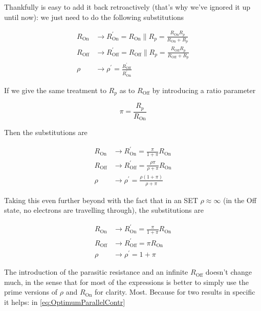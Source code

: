 \documentclass[../main.tex]{subfiles}
\begin{document}
Thankfully is easy to add it back retroactively (that's why we've ignored it
up until now): we just need to do the following substitutions

\begin{align*}
    R_{\text{On}}& \rightarrow R^{\prime}_{\text{On}}
    = R_{\text{On}} \parallel R_{p}
    = \frac{R_{\text{On}}R_{p}}{R_{\text{On}} + R_{p}}\\
    R_{\text{Off}}& \rightarrow R^{\prime}_{\text{Off}}
    = R_{\text{Off}} \parallel R_{p}
    = \frac{R_{\text{Off}}R_{p}}{R_{\text{Off}} + R_{p}}\\
    \rho& \rightarrow \rho^{\prime} 
    = \frac{R^{\prime}_{\text{Off}}}{R^{\prime}_{\text{On}}}
\end{align*}

If we give the same treatment to \(R_{p}\) as to \(R_{\text{Off}}\) by
introducing a ratio parameter

\begin{equation}
\label{eq:PiDef}
    \pi = \frac{R_{p}}{R_{\text{On}}}
\end{equation}

Then the substitutions are

\begin{align*}
    R_{\text{On}}& \rightarrow R^{\prime}_{\text{On}}
    = \frac{\pi}{1 + \pi} R_{\text{On}}\\
    R_{\text{Off}}& \rightarrow R^{\prime}_{\text{Off}}
    = \frac{\rho\pi}{\rho + \pi}R_{\text{On}}\\
    \rho& \rightarrow \rho^{\prime} 
    = \frac{\rho(1 + \pi)}{\rho + \pi}
\end{align*}

Taking this even further beyond with the fact that in an SET
\(\rho \approx \infty\) (in the Off state, no electrons are travelling through),
the substitutions are

\begin{align*}
    R_{\text{On}}& \rightarrow R^{\prime}_{\text{On}}
    = \frac{\pi}{1 + \pi} R_{\text{On}}\\
    R_{\text{Off}}& \rightarrow R^{\prime}_{\text{Off}}
    = \pi R_{\text{On}}\\
    \rho& \rightarrow \rho^{\prime} 
    = 1 + \pi
\end{align*}

The introduction of the parasitic resistance and an infinite \(R_{\text{Off}}\)
doesn't change much, in the sense that for most of the expressions is better
to simply use the prime versions of \(\rho\) and \(R_{\text{On}}\) for clarity.
Most. Because for two results in specific it helps: in
\ref{eq:OptimumParallelContr}
\end{document}
